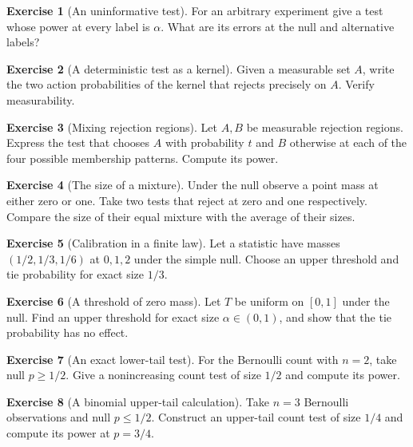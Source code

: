 \documentclass[11pt,oneside]{book}
\theoremstyle{definition}
\newtheorem{exercise}{Exercise}[section]
\theoremstyle{remark}
\begin{document}
\begin{exercise}[An uninformative test]
\label{exer:test-constant-level}
For an arbitrary experiment give a test whose power at every label
is $\alpha$. What are its errors at the null and alternative labels?
\end{exercise}

\begin{exercise}[A deterministic test as a kernel]
\label{exer:test-indicator-kernel}
Given a measurable set $A$, write the two action probabilities of
the kernel that rejects precisely on $A$. Verify measurability.
\end{exercise}

\begin{exercise}[Mixing rejection regions]
\label{exer:test-mixture-overlap}
Let $A,B$ be measurable rejection regions. Express the test that
chooses $A$ with probability $t$ and $B$ otherwise at each of the
four possible membership patterns. Compute its power.
\end{exercise}

\begin{exercise}[The size of a mixture]
\label{exer:test-size-mixture-strict}
Under the null observe a point mass at either zero or one. Take
two tests that reject at zero and one respectively. Compare the
size of their equal mixture with the average of their sizes.
\end{exercise}

\begin{exercise}[Calibration in a finite law]
\label{exer:test-finite-threshold-gamma}
Let a statistic have masses $(1/2,1/3,1/6)$ at $0,1,2$ under
the simple null. Choose an upper threshold and tie probability
for exact size $1/3$.
\end{exercise}

\begin{exercise}[A threshold of zero mass]
\label{exer:test-zero-threshold-atom}
Let $T$ be uniform on $[0,1]$ under the null. Find an upper
threshold for exact size $\alpha\in(0,1)$, and show that the tie
probability has no effect.
\end{exercise}

\begin{exercise}[An exact lower-tail test]
\label{exer:test-binomial-lower-tail}
For the Bernoulli count with $n=2$, take null $p\geq1/2$.
Give a nonincreasing count test of size $1/2$ and compute its power.
\end{exercise}

\begin{exercise}[A binomial upper-tail calculation]
\label{exer:test-binomial-three-calibration}
Take $n=3$ Bernoulli observations and null $p\leq1/2$.
Construct an upper-tail count test of size $1/4$ and compute
its power at $p=3/4$.
\end{exercise}
\end{document}
